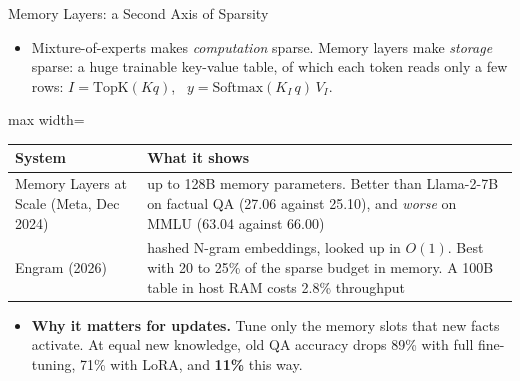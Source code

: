 \begin{frame}{Memory Layers: a Second Axis of Sparsity}
    \begin{itemize}\itemsep0.3em
        \item Mixture-of-experts makes \emph{computation} sparse. Memory layers make \emph{storage} sparse: a huge trainable key-value table, of which each token reads only a few rows:
        $I=\mathrm{TopK}(Kq)$, \ $y=\mathrm{Softmax}(K_I\,q)\,V_I$.
    \end{itemize}
    \begin{center}
    \footnotesize
    \renewcommand{\arraystretch}{1.15}
    \begin{adjustbox}{max width=\linewidth}\begin{tabular}{>{\raggedright\arraybackslash}p{3.6cm}>{\raggedright\arraybackslash}p{9.6cm}}
        \toprule
        \textbf{System} & \textbf{What it shows} \\
        \midrule
        Memory Layers at Scale (Meta, Dec 2024) & up to 128B memory parameters. Better than Llama-2-7B on factual QA (27.06 against 25.10), and \emph{worse} on MMLU (63.04 against 66.00) \\
        \rowcolor{KAUSTcyan!12} Engram (2026) & hashed N-gram embeddings, looked up in $O(1)$. Best with 20 to 25\% of the sparse budget in memory. A 100B table in host RAM costs 2.8\% throughput \\
        \bottomrule
    \end{tabular}\end{adjustbox}
    \end{center}
    \begin{itemize}\itemsep0.3em
        \item \textbf{Why it matters for updates.} Tune only the memory slots that new facts activate. At equal new knowledge, old QA accuracy drops 89\% with full fine-tuning, 71\% with LoRA, and \textbf{11\%} this way.
    \end{itemize}
\end{frame}

